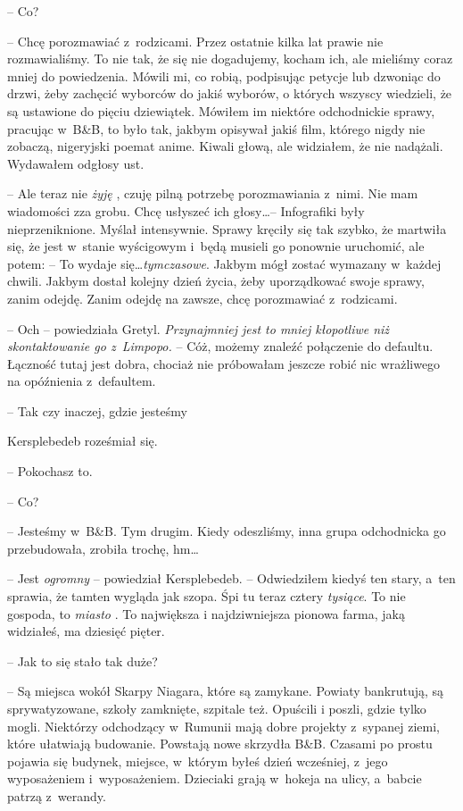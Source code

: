 \documentclass[oneside,polish,11pt,sfheadings]{mwbk}
\begin{document}
-- Co?

-- Chcę porozmawiać z~rodzicami. Przez ostatnie kilka lat prawie nie
rozmawialiśmy. To nie tak, że się nie dogadujemy, kocham ich, ale
mieliśmy coraz mniej do powiedzenia. Mówili mi, co robią, podpisując
petycje lub dzwoniąc do drzwi, żeby zachęcić wyborców do jakiś wyborów,
o których wszyscy wiedzieli, że są ustawione do pięciu dziewiątek.
Mówiłem im niektóre odchodnickie sprawy, pracując w~B\&B, to było tak,
jakbym opisywał jakiś film, którego nigdy nie zobaczą, nigeryjski poemat
anime. Kiwali głową, ale widziałem, że nie nadążali. Wydawałem odgłosy
ust.

-- Ale teraz nie \textit{żyję }, czuję pilną potrzebę porozmawiania z~nimi.
Nie mam wiadomości zza grobu. Chcę usłyszeć ich głosy\ldots  -- Infografiki
były nieprzeniknione. Myślał intensywnie. Sprawy kręciły się tak szybko,
że martwiła się, że jest w~stanie wyścigowym i~będą musieli go ponownie
uruchomić, ale potem: -- To wydaje się\ldots  \textit{tymczasowe}. Jakbym mógł
zostać wymazany w~każdej chwili. Jakbym dostał kolejny dzień życia, żeby
uporządkować swoje sprawy, zanim odejdę. Zanim odejdę na zawsze, chcę
porozmawiać z~rodzicami.

-- Och -- powiedziała Gretyl. \textit{Przynajmniej jest to mniej kłopotliwe
niż skontaktowanie go z~Limpopo.} -- Cóż, możemy znaleźć połączenie do
defaultu. Łączność tutaj jest dobra, chociaż nie próbowałam jeszcze
robić nic wrażliwego na opóźnienia z~defaultem.

-- Tak czy inaczej, gdzie jesteśmy

Kersplebedeb roześmiał się. 

-- Pokochasz to.

-- Co?

-- Jesteśmy w~B\&B. Tym drugim. Kiedy odeszliśmy, inna grupa odchodnicka
go przebudowała, zrobiła trochę, hm\ldots 

-- Jest \textit{ogromny }-- powiedział Kersplebedeb. -- Odwiedziłem kiedyś
ten stary, a~ten sprawia, że tamten wygląda jak szopa. Śpi tu teraz
cztery \textit{tysiące}. To nie gospoda, to \textit{miasto }. To największa
i najdziwniejsza pionowa farma, jaką widziałeś, ma dziesięć pięter.

-- Jak to się stało tak duże?

-- Są miejsca wokół Skarpy Niagara, które są zamykane. Powiaty
bankrutują, są sprywatyzowane, szkoły zamknięte, szpitale też. Opuścili
i poszli, gdzie tylko mogli. Niektórzy odchodzący w~Rumunii mają dobre
projekty z~sypanej ziemi, które ułatwiają budowanie. Powstają nowe
skrzydła B\&B. Czasami po prostu pojawia się budynek, miejsce, w~którym
byłeś dzień wcześniej, z~jego wyposażeniem i~wyposażeniem. Dzieciaki
grają w~hokeja na ulicy, a~babcie patrzą z~werandy.
\end{document}
